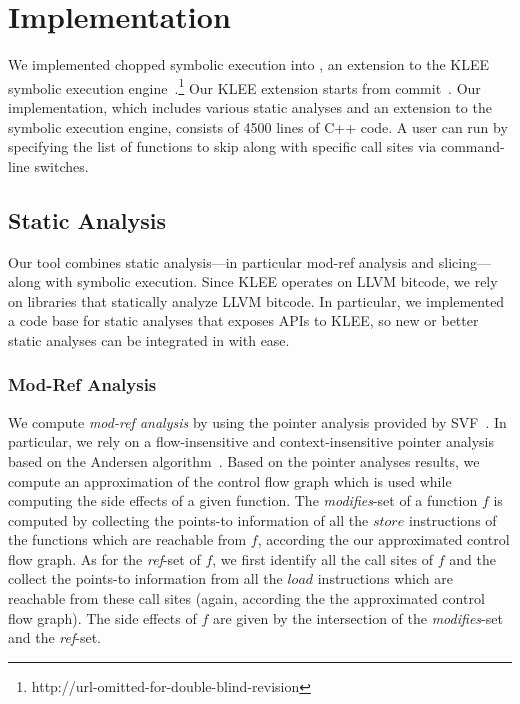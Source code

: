 
\chapter{Implementation}\label{chapter:implementation}

We implemented chopped symbolic execution into \toolname, an extension
to the KLEE symbolic execution
engine~\cite{klee}.\footnote{http://url-omitted-for-double-blind-revision}
Our KLEE extension starts from commit~.
Our implementation, which includes various static analyses
and an extension to the symbolic execution engine,
consists of 4500 lines of C++ code.
A user can run \toolname by
specifying the list of functions to skip along with specific call
sites via command-line switches.

\section{Static Analysis}
Our tool combines static analysis---in
particular mod-ref analysis and slicing---along with symbolic
execution. Since KLEE operates on LLVM bitcode, we rely on libraries
that statically analyze LLVM bitcode.
In particular, we implemented a code base for static analyses that exposes APIs to KLEE, so new or
better static analyses can be integrated in \toolname with ease.

\subsection{Mod-Ref Analysis}
We compute \textit{mod-ref analysis} by using the pointer analysis
provided by SVF~\cite{sui2016svf}. In particular, we rely on a
flow-insensitive and context-insensitive pointer analysis based on the
Andersen algorithm~\cite{andersen:pointeranalysis}.
Based on the pointer analyses results,
we compute an approximation of the control flow graph
which is used while computing the side effects of a given function.
The \textit{modifies}-set of a function $f$ is computed
by collecting the points-to information of all the $store$ instructions of the functions which
are reachable from $f$, according the our approximated control flow graph.
As for the \textit{ref}-set of $f$, we first identify all the call sites of $f$
and the collect the points-to information from all the $load$ instructions which are reachable
from these call sites (again, according the the approximated control flow graph).
The side effects of $f$ are given by the intersection of the \textit{modifies}-set and the \textit{ref}-set.

